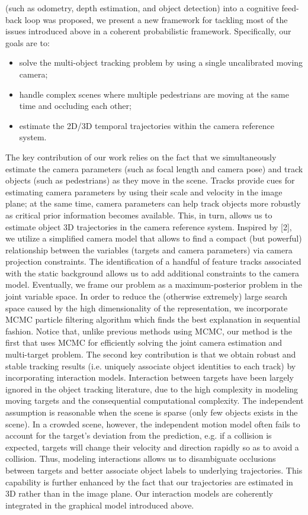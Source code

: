 (such as odometry, depth estimation, and object detection) into a cognitive feed-
back loop was proposed, we present a new framework for tackling most of the
issues introduced above in a coherent probabilistic framework. Specifically, our
goals are to: 
\begin{itemize}
\item solve the multi-object tracking problem by using a single uncalibrated moving camera; 
\item handle complex scenes where multiple pedestrians are moving at the same time and occluding each other; 
\item estimate the 2D/3D temporal trajectories within the camera reference system.
\end{itemize}
The key contribution of our work relies on the fact that we simultaneously estimate the camera parameters (such as focal length and camera pose) and track objects (such as pedestrians) as they move in the scene. 
Tracks provide cues for estimating camera parameters by using their scale and velocity in the image plane; at the same time, camera parameters can help track objects more
robustly as critical prior information becomes available. This, in turn, allows
us to estimate object 3D trajectories in the camera reference system. Inspired
by [2], we utilize a simplified camera model that allows to find a compact (but
powerful) relationship between the variables (targets and camera parameters) via
camera projection constraints. The identification of a handful of feature tracks
associated with the static background allows us to add additional constraints to
the camera model. Eventually, we frame our problem as a maximum-posterior
problem in the joint variable space. In order to reduce the (otherwise extremely)
large search space caused by the high dimensionality of the representation, we
incorporate MCMC particle filtering algorithm which finds the best explanation
in sequential fashion. Notice that, unlike previous methods using MCMC, our
method is the first that uses MCMC for efficiently solving the joint camera
estimation and multi-target problem.
The second key contribution is that we obtain robust and stable tracking
results (i.e. uniquely associate object identities to each track) by incorporating
interaction models. Interaction between targets have been largely ignored in the
object tracking literature, due to the high complexity in modeling moving targets
and the consequential computational complexity. The independent assumption
is reasonable when the scene is sparse (only few objects exists in the scene). In a
crowded scene, however, the independent motion model often fails to account for
the target’s deviation from the prediction, e.g. if a collision is expected, targets
will change their velocity and direction rapidly so as to avoid a collision. Thus,
modeling interactions allows us to disambiguate occlusions between targets and
better associate object labels to underlying trajectories. This capability is further
enhanced by the fact that our trajectories are estimated in 3D rather than in the
image plane. Our interaction models are coherently integrated in the graphical
model introduced above.

